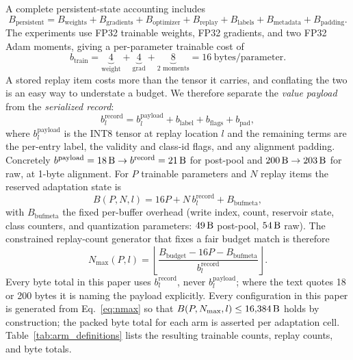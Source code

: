 A complete persistent-state accounting includes
\begin{equation}
B_{\mathrm{persistent}} =
B_{\mathrm{weights}}+B_{\mathrm{gradients}}+B_{\mathrm{optimizer}}
+B_{\mathrm{replay}}+B_{\mathrm{labels}}+B_{\mathrm{metadata}}+B_{\mathrm{padding}}.
\label{eq:completebudget}
\end{equation}
The experiments use FP32 trainable weights, FP32 gradients, and two FP32 Adam
moments, giving a per-parameter trainable cost of
\begin{equation}
b_{\mathrm{train}}=\underbrace{4}_{\text{weight}}+\underbrace{4}_{\text{grad}}
+\underbrace{8}_{\text{2 moments}}=16\ \mathrm{bytes/parameter}.
\end{equation}
A stored replay item costs more than the tensor it carries, and conflating the
two is an easy way to understate a budget. We therefore separate the
\emph{value payload} from the \emph{serialized record}:
\begin{equation}
b_l^{\mathrm{record}} =
b_l^{\mathrm{payload}} + b_{\mathrm{label}} + b_{\mathrm{flags}}
+ b_{\mathrm{pad}},
\label{eq:record}
\end{equation}
where $b_l^{\mathrm{payload}}$ is the INT8 tensor at replay location $l$ and the
remaining terms are the per-entry label, the validity and class-id flags, and any
alignment padding. Concretely
$b^{\mathrm{payload}} = 18\,\mathrm{B} \to b^{\mathrm{record}} = 21\,\mathrm{B}$ for
post-pool and $200\,\mathrm{B} \to 203\,\mathrm{B}$ for raw, at 1-byte alignment. For $P$
trainable parameters and $N$ replay items the reserved adaptation state is
\begin{equation}
B(P,N,l)=16P+N\,b_l^{\mathrm{record}}+B_{\mathrm{bufmeta}},
\label{eq:completebudget2}
\end{equation}
with $B_{\mathrm{bufmeta}}$ the fixed per-buffer overhead (write
index, count, reservoir state, class counters, and quantization parameters:
$49\,\mathrm{B}$ post-pool, $54\,\mathrm{B}$ raw). The constrained replay-count generator that
fixes a fair budget match is therefore
\begin{equation}
N_{\max}(P,l)=
\left\lfloor
\frac{B_{\mathrm{budget}}-16P-B_{\mathrm{bufmeta}}}
     {b_l^{\mathrm{record}}}
\right\rfloor .
\label{eq:nmax}
\end{equation}
Every byte total in this paper uses $b_l^{\mathrm{record}}$, never
$b_l^{\mathrm{payload}}$; where the text quotes 18 or 200 bytes it is naming the
payload explicitly.
Every configuration in this paper is generated from Eq.~\eqref{eq:nmax} so that
$B(P,N_{\max},l)\le 16{,}384\,\mathrm{B}$ holds by construction; the packed byte total
for each arm is asserted per adaptation cell. Table~\ref{tab:arm_definitions}
lists the resulting trainable counts, replay counts, and byte totals.

